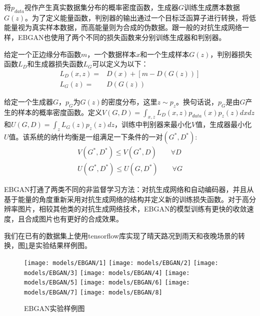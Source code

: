 将$p_{data}$视作产生真实数据集分布的概率密度函数，生成器$G$训练生成赝本数据$G(z)$。为了定义能量函数，判别器的输出通过一个目标泛函算子进行转换，将低能量视为真实样本数据，而高能量则为合成的伪数据。跟一般的对抗生成网络一样，EBGAN也使用了两个不同的损失函数来分别训练生成器和判别器。

给定一个正边缘分布函数$m$，一个数据样本$x$和一个生成样本$G(z)$，判别器损失函数$L_D$和生成器损失函数$L_G$可以定义为以下：
\begin{equation}
    \begin{align*}
    L_D(x, z) = & D(x) + [m - D(G(z))] \\
    L_G(z) = & D(G(z))
    \end{align*}
\end{equation}

给定一个生成器$G$，$p_G$为$G(z)$的密度分布，这里$z\sim p_z$。换句话说，$p_G$是由$G$产生的样本的概率密度函数。定义$V(G,D)=\int_{x,z}L_D(x,z)p_{data}(x)p_z(z)dxdz$和$U(G,D)=\int_zL_G(z)p_z(z)dz$，训练中判别器来最小化$V$值，生成器最小化$U$值。该系统的纳什均衡是一组满足一下条件的一对$(G^*,D^*)$:
\begin{equation}
    \begin{aligned}
        V(G^*,D^*) \leq V(G^*,D) \quad\quad \forall D \\
        U(G^*,D^*) \leq U(G,D^*) \quad\quad \forall G 
    \end{aligned}
\end{equation}

EBGAN打通了两类不同的非监督学习方法：对抗生成网络和自动编码器，并且从基于能量的角度重新采用对抗生成网络的结构并定义新的训练损失函数。对于高分辨率图片，相较其他类的对抗生成网络技术，EBGAN的模型训练有更快的收敛速度，且合成图片也有更好的合成效果。

我们在已有的数据集上使用tensorflow库实现了晴天路况到雨天和夜晚场景的转换，图\ref{fig:ebgan}是实验结果样例图。

\begin{figure}[ht]
    \centering
    \texttt{[image: models/EBGAN/1]}
    \texttt{[image: models/EBGAN/2]}
    \texttt{[image: models/EBGAN/3]}
    \texttt{[image: models/EBGAN/4]}
    \texttt{[image: models/EBGAN/5]}
    \texttt{[image: models/EBGAN/6]}
    \texttt{[image: models/EBGAN/7]}
    \texttt{[image: models/EBGAN/8]}
    \caption{EBGAN实验样例图}
    \label{fig:ebgan}
\end{figure}

